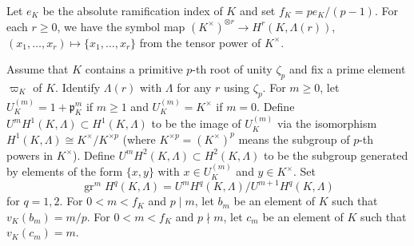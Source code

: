 \documentclass{amsart}
\theoremstyle{remark}
\numberwithin{equation}{subsection}
\newcommand{\tensor}{\mathbin{\otimes}}
\newcommand{\ideal}[1]{\mathfrak{#1}}
\DeclareMathOperator{\gr}{gr}
\begin{document}
Let $e_{K}$ be the absolute ramification index of $K$
and set $f_{K} = p e_{K} / (p - 1)$.
For each $r \ge 0$, we have the symbol map
$(K^{\times})^{\tensor r} \to H^{r}(K, \Lambda(r))$,
$(x_{1}, \dots, x_{r}) \mapsto \{x_{1}, \dots, x_{r}\}$
from the tensor power of $K^{\times}$.

Assume that $K$ contains a primitive $p$-th root of unity $\zeta_{p}$
and fix a prime element $\varpi_{K}$ of $K$.
Identify $\Lambda(r)$ with $\Lambda$ for any $r$ using $\zeta_{p}$.
For $m \ge 0$, let $U_{K}^{(m)} = 1 + \ideal{p}_{K}^{m}$ if $m \ge 1$
and $U_{K}^{(m)} = K^{\times}$ if $m = 0$.
Define $U^{m} H^{1}(K, \Lambda) \subset H^{1}(K, \Lambda)$ to be the image of $U_{K}^{(m)}$
via the isomorphism $H^{1}(K, \Lambda) \cong K^{\times} / K^{\times p}$
(where $K^{\times p} = (K^{\times})^{p}$ means the subgroup of $p$-th powers in $K^{\times}$).
Define $U^{m} H^{2}(K, \Lambda) \subset H^{2}(K, \Lambda)$ to be the subgroup generated by
elements of the form $\{x, y\}$ with $x \in U_{K}^{(m)}$ and $y \in K^{\times}$.
Set
	\[
			\gr^{m} H^{q}(K, \Lambda)
		=
			U^{m} H^{q}(K, \Lambda) / U^{m + 1} H^{q}(K, \Lambda)
	\]
for $q = 1, 2$.
For $0 < m < f_{K}$ and $p \mid m$,
let $b_{m}$ be an element of $K$ such that $v_{K}(b_{m}) = m / p$.
For $0 < m < f_{K}$ and $p \nmid m$,
let $c_{m}$ be an element of $K$ such that $v_{K}(c_{m}) = m$.
\end{document}
